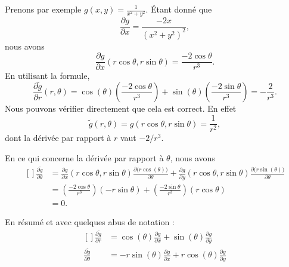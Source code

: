 Prenons par exemple \( g(x,y)=\frac{1}{ x^2+y^2 }\). Étant donné que
\begin{equation}
	\frac{ \partial g }{ \partial x }=\frac{ -2x }{ (x^2+y^2)^2 },
\end{equation}
nous avons
\begin{equation}
	\frac{ \partial g }{ \partial x }(r\cos\theta,r\sin\theta)=\frac{ -2\cos\theta }{ r^3 }.
\end{equation}
En utilisant la formule,
\begin{equation}
	\frac{ \partial \tilde g }{ \partial r }(r,\theta)=\cos(\theta)\left( \frac{ -2\cos\theta }{ r^3 } \right)+\sin(\theta)\left( \frac{ -2\sin\theta }{ r^3 } \right)=-\frac{ 2 }{ r^3 }.
\end{equation}
Nous pouvons vérifier directement que cela est correct. En effet
\begin{equation}
	\tilde g(r,\theta)=g(r\cos\theta,r\sin\theta)=\frac{1}{ r^2 },
\end{equation}
dont la dérivée par rapport à \( r\) vaut \( -2/r^3\).

En ce qui concerne la dérivée par rapport à \( \theta\), nous avons
\begin{equation}
	\begin{aligned}[]
		\frac{ \partial \tilde g }{ \partial \theta } & =\frac{ \partial g }{ \partial x }(r\cos\theta,r\sin\theta)\frac{ \partial \big( r\cos(\theta) \big) }{ \partial \theta }+\frac{ \partial g }{ \partial y }(r\cos\theta,r\sin\theta)\frac{ \partial \big( r\sin(\theta) \big) }{ \partial \theta } \\
		                                              & =\left( \frac{ -2\cos\theta }{ r^3 } \right)(-r\sin\theta)+\left( \frac{ -2\sin\theta }{ r^3 } \right)(r\cos\theta)                                                                                                                                \\
		                                              & =0.
	\end{aligned}
\end{equation}

En résumé et avec quelques abus de notation :
\begin{equation}
	\begin{aligned}[]
		\frac{ \partial \tilde g }{ \partial r }      & =\cos(\theta)\frac{ \partial g }{ \partial x }+\sin(\theta)\frac{ \partial g }{ \partial y }    \\
		\frac{ \partial \tilde g }{ \partial \theta } & =-r\sin(\theta)\frac{ \partial g }{ \partial x }+r\cos(\theta)\frac{ \partial g }{ \partial y } \\
	\end{aligned}
\end{equation}

